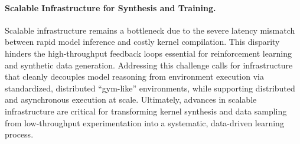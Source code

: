 
\paragraph{Scalable Infrastructure for Synthesis and Training.} Scalable infrastructure remains a bottleneck due to the severe latency mismatch between rapid model inference and costly kernel compilation. This disparity hinders the high-throughput feedback loops essential for reinforcement learning and synthetic data generation. Addressing this challenge calls for infrastructure that cleanly decouples model reasoning from environment execution via standardized, distributed ``gym-like'' environments, while supporting distributed and asynchronous execution at scale. Ultimately, advances in scalable infrastructure are critical for transforming kernel synthesis and data sampling from low-throughput experimentation into a systematic, data-driven learning process.





